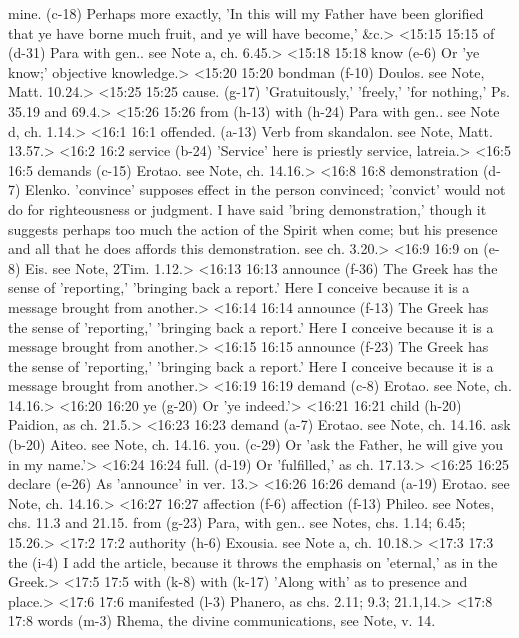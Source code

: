   mine. (c-18)  Perhaps more exactly, 'In this will my Father have been  glorified that ye have borne much fruit, and ye will have  become,' &c.>
<15:15 15:15  of (d-31)  Para with gen.. see Note a, ch. 6.45.>
<15:18 15:18  know (e-6)  Or 'ye know;' objective knowledge.>
<15:20 15:20  bondman (f-10)  Doulos. see Note, Matt. 10.24.>
<15:25 15:25  cause. (g-17)  'Gratuitously,' 'freely,' 'for nothing,' Ps. 35.19 and 69.4.>
<15:26 15:26  from (h-13)  with (h-24)
  Para with gen.. see Note d, ch. 1.14.>
<16:1 16:1  offended. (a-13)  Verb from skandalon. see Note, Matt. 13.57.>
<16:2 16:2  service (b-24)  'Service' here is priestly service, latreia.>
<16:5 16:5  demands (c-15)  Erotao. see Note, ch. 14.16.>
<16:8 16:8  demonstration (d-7)  Elenko. 'convince' supposes effect in the person convinced;  'convict' would not do for righteousness or judgment. I have  said 'bring demonstration,' though it suggests perhaps too much  the action of the Spirit when come; but his presence and all  that he does affords this demonstration. see ch. 3.20.>
<16:9 16:9  on (e-8)  Eis. see Note, 2Tim. 1.12.>
<16:13 16:13  announce (f-36) The Greek has the sense of 'reporting,' 'bringing back a report.' Here I conceive because it is a message brought from another.>
<16:14 16:14  announce (f-13) The Greek has the sense of 'reporting,' 'bringing back a report.' Here I conceive because it is a message brought from another.>
<16:15 16:15  announce (f-23)  The Greek has the sense of 'reporting,' 'bringing back a  report.' Here I conceive because it is a message brought from  another.>
<16:19 16:19  demand (c-8)  Erotao. see Note, ch. 14.16.>
<16:20 16:20  ye (g-20)  Or 'ye indeed.'>
<16:21 16:21  child (h-20)  Paidion, as ch. 21.5.>
<16:23 16:23  demand (a-7)  Erotao. see Note, ch. 14.16.
  ask (b-20)  Aiteo. see Note, ch. 14.16.
  you. (c-29)  Or 'ask the Father, he will give you in my name.'>
<16:24 16:24  full. (d-19)  Or 'fulfilled,' as ch. 17.13.>
<16:25 16:25  declare (e-26)  As 'announce' in ver. 13.>
<16:26 16:26  demand (a-19)  Erotao. see Note, ch. 14.16.>
<16:27 16:27  affection (f-6)  affection (f-13)
  Phileo. see Notes, chs. 11.3 and 21.15.
  from (g-23)  Para, with gen.. see Notes, chs. 1.14; 6.45; 15.26.>
<17:2 17:2  authority (h-6)  Exousia. see Note a, ch. 10.18.>
<17:3 17:3  the (i-4)  I add the article, because it throws the emphasis on  'eternal,' as in the Greek.>
<17:5 17:5  with (k-8)  with (k-17)
  'Along with' as to presence and place.>
<17:6 17:6  manifested (l-3)  Phanero, as chs. 2.11; 9.3; 21.1,14.>
<17:8 17:8  words (m-3)  Rhema, the divine communications, see Note, v. 14.
